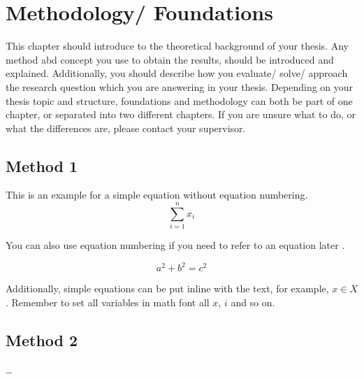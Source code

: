 \chapter{Methodology/ Foundations}
\label{ch:methods}

This chapter should introduce to the theoretical background of your thesis. Any method abd concept you use to obtain the results, should be introduced and explained. Additionally, you should describe how you evaluate/ solve/ approach the research question which you are answering in your thesis. Depending on your thesis topic and structure, foundations and methodology can both be part of one chapter, or separated into two different chapters. If you are unsure what to do, or what the differences are, please contact your supervisor.

\section{Method 1}

This is an example for a simple equation without equation numbering.
$$
\sum\limits_{i=1}^{n}{x_i}
$$

You can also use equation numbering if you need to refer to an equation later \eg {}.


\begin{equation}
a^2 + b^2 = c^2
\label{eq:ex1}
\end{equation}

Additionally, simple equations can be put inline with the text, for example, $x \in X$. Remember to set all variables in math font \ie all $x$, $i$ and so on.

\section{Method 2}

\dots

